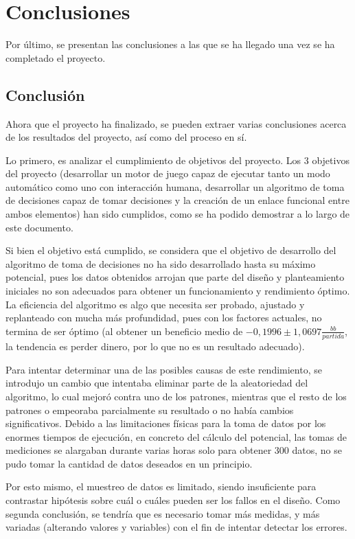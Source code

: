 \chapter{Conclusiones}

Por último, se presentan las conclusiones a las que se ha llegado una vez se ha completado el proyecto.

\section{Conclusión}

Ahora que el proyecto ha finalizado, se pueden extraer varias conclusiones acerca de los resultados del proyecto, así como del proceso en sí. 

Lo primero, es analizar el cumplimiento de objetivos del proyecto.
Los 3 objetivos del proyecto (desarrollar un motor de juego capaz de ejecutar tanto un modo automático como uno con interacción humana, desarrollar un algoritmo de toma de decisiones capaz de tomar decisiones y la creación de un enlace funcional entre ambos elementos) han sido cumplidos, como se ha podido demostrar a lo largo de este documento.

Si bien el objetivo está cumplido, se considera que el objetivo de desarrollo del algoritmo de toma de decisiones no ha sido desarrollado hasta su máximo potencial, pues los datos obtenidos arrojan que parte del diseño y planteamiento iniciales no son adecuados para obtener un funcionamiento y rendimiento óptimo. 
La eficiencia del algoritmo es algo que necesita ser probado, ajustado y replanteado con mucha más profundidad, pues con los factores actuales, no termina de ser óptimo (al obtener un beneficio medio de  $-0,1996\pm1,0697$$\frac{bb}{partida}$, la tendencia es perder dinero, por lo que no es un resultado adecuado).

Para intentar determinar una de las posibles causas de este rendimiento, se introdujo un cambio que intentaba eliminar parte de la aleatoriedad del algoritmo, lo cual mejoró contra uno de los patrones, mientras que el resto de los patrones o empeoraba parcialmente su resultado o no había cambios significativos.
Debido a las limitaciones físicas para la toma de datos por los enormes tiempos de ejecución, en concreto del cálculo del potencial, las tomas de mediciones se alargaban durante varias horas solo para obtener 300 datos, no se pudo tomar la cantidad de datos deseados en un principio.

Por esto mismo, el muestreo de datos es limitado, siendo insuficiente para contrastar hipótesis sobre cuál o cuáles pueden ser los fallos en el diseño. Como segunda conclusión, se tendría que es necesario tomar más medidas, y más variadas (alterando valores y variables) con el fin de intentar detectar los errores.

